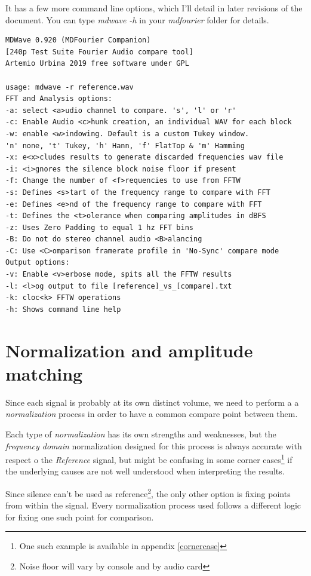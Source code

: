 \documentclass[10pt,a4paper]{report}
\begin{document}
\begin{appendices}
It has a few more command line options, which I'll detail in later revisions of the document. You can type \textit{mdwave -h} in your \textit{mdfourier} folder for details.

\begin{verbatim}
MDWave 0.920 (MDFourier Companion)
[240p Test Suite Fourier Audio compare tool]
Artemio Urbina 2019 free software under GPL

usage: mdwave -r reference.wav
FFT and Analysis options:
-a: select <a>udio channel to compare. 's', 'l' or 'r'
-c: Enable Audio <c>hunk creation, an individual WAV for each block
-w: enable <w>indowing. Default is a custom Tukey window.
'n' none, 't' Tukey, 'h' Hann, 'f' FlatTop & 'm' Hamming
-x: e<x>cludes results to generate discarded frequencies wav file
-i: <i>gnores the silence block noise floor if present
-f: Change the number of <f>requencies to use from FFTW
-s: Defines <s>tart of the frequency range to compare with FFT
-e: Defines <e>nd of the frequency range to compare with FFT
-t: Defines the <t>olerance when comparing amplitudes in dBFS
-z: Uses Zero Padding to equal 1 hz FFT bins
-B: Do not do stereo channel audio <B>alancing
-C: Use <C>omparison framerate profile in 'No-Sync' compare mode
Output options:
-v: Enable <v>erbose mode, spits all the FFTW results
-l: <l>og output to file [reference]_vs_[compare].txt
-k: cloc<k> FFTW operations
-h: Shows command line help
\end{verbatim}

\chapter{Normalization and amplitude matching}
\label{normalization}

Since each signal is probably at its own distinct volume, we need to perform a a \textit{normalization} process in order to have a common compare point between them.

Each type of \textit{normalization} has its own strengths and weaknesses, but the \textit{frequency domain} normalization designed for this process is always accurate with respect o the \textit{Reference} signal, but might be confusing in some corner cases\footnote{One such example is available in appendix \ref{cornercase}} if the underlying causes are not well understood when interpreting the results.

Since silence can't be used as reference\footnote{Noise floor will vary by console and by audio card}, the only other option is fixing points from within the signal. Every normalization process used follows a different logic for fixing one such point for comparison.


\end{appendices}
\end{document}
